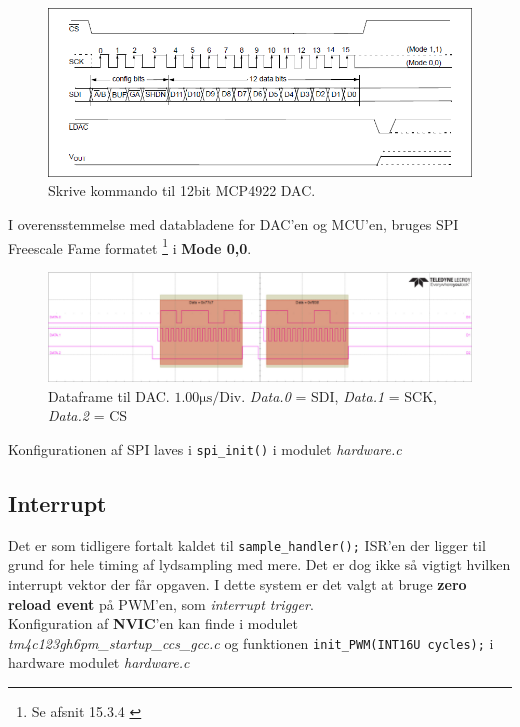 \begin{figure}[h!]
	\centering
	\includegraphics[width=.8\textwidth]{billeder/dac12bit_writecmd.png}
	\caption{Skrive kommando til 12bit MCP4922 DAC.\cite[s. 25]{mcp4922}}
	\label{fig:dac12bit_writecmd}
\end{figure}

I overensstemmelse med databladene for DAC'en og MCU'en, bruges SPI Freescale Fame formatet \footnote{Se afsnit 15.3.4 \cite[s. 954]{tm4c123gh6pm}} i \textbf{Mode 0,0}.

\begin{figure}[h!]
	\centering
	\includegraphics[width=\textwidth]{billeder/dac_dataframe.png}
	\caption{Dataframe til DAC. $1.00\si{\micro\second}\text{/Div}$. \textit{Data.0} = SDI, \textit{Data.1} = SCK, \textit{Data.2} = CS}
	\label{fig:dac_dataframe}
\end{figure}

Konfigurationen af SPI laves i \texttt{spi\_init()} i modulet \textit{hardware.c}  

\FloatBlock

\subsection{Interrupt}
Det er som tidligere fortalt kaldet til \texttt{sample\_handler();} ISR'en der ligger til grund for hele timing af lydsampling med mere.
Det er dog ikke så vigtigt hvilken interrupt vektor der får opgaven.
I dette system er det valgt at bruge \textbf{zero reload event} på PWM'en, som \textit{interrupt trigger}.\\

Konfiguration af \textbf{NVIC}'en kan finde i modulet \textit{tm4c123gh6pm\_startup\_ccs\_gcc.c} og funktionen \texttt{init\_PWM(INT16U cycles);} i hardware modulet \textit{hardware.c}

